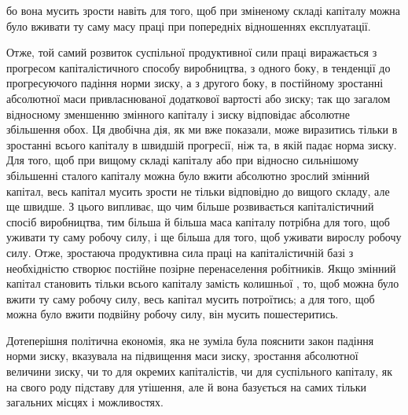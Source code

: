 \parcont{}  %
бо вона мусить зрости навіть для того, щоб при зміненому
складі капіталу можна було вживати ту саму масу праці при
попередніх відношеннях експлуатації.

Отже, той самий розвиток суспільної продуктивної сили
праці виражається з прогресом капіталістичного способу виробництва,
з одного боку, в тенденції до прогресуючого падіння
норми зиску, а з другого боку, в постійному зростанні абсолютної
маси привласнюваної додаткової вартості або зиску; так
що загалом відносному зменшенню змінного капіталу і зиску
відповідає абсолютне збільшення обох. Ця двобічна дія, як ми
вже показали, може виразитись тільки в зростанні всього капіталу
в швидшій прогресії, ніж та, в якій падає норма зиску. Для
того, щоб при вищому складі капіталу або при відносно сильнішому
збільшенні сталого капіталу можна було вжити абсолютно
зрослий змінний капітал, весь капітал мусить зрости не
тільки відповідно до вищого складу, але ще швидше. З цього
випливає, що чим більше розвивається капіталістичний спосіб
виробництва, тим більша й більша маса капіталу потрібна для
того, щоб уживати ту саму робочу силу, і ще більша для того,
щоб уживати вирослу робочу силу. Отже, зростаюча продуктивна
сила праці на капіталістичній базі з необхідністю створює
постійне позірне перенаселення робітників. Якщо змінний капітал
становить тільки  всього капіталу замість колишньої
, то, щоб можна було вжити ту саму робочу силу, весь
капітал мусить потроїтись; а для того, щоб можна було вжити
подвійну робочу силу, він мусить пошестеритись.

Дотеперішня політична економія, яка не зуміла була пояснити
закон падіння норми зиску, вказувала на підвищення маси
зиску, зростання абсолютної величини зиску, чи то для окремих
капіталістів, чи для суспільного капіталу, як на свого роду
підставу для утішення, але й вона базується на самих тільки
загальних місцях і можливостях.

